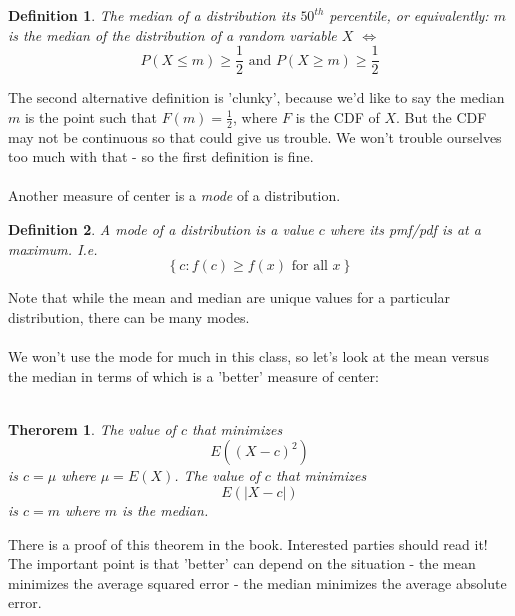 \documentclass[12pt]{article} %
\newtheorem{defn}{Definition}
\newtheorem{thm}{Therorem}
\begin{document}
\begin{defn}
The \emph{median} of a  distribution its $50^{th}$ percentile, or equivalently: $m$ is the median of the distribution of a random variable $X$ $\iff$
$$P(X\leq m)\geq \frac12 \textrm{ and } P(X\geq m)\geq\frac12$$
\end{defn}
The second alternative definition is 'clunky', because we'd like to say the median $m$ is the point such that $F(m) = \frac12$, where $F$ is the CDF of $X$. But the CDF may not be continuous so that could give us trouble. We won't trouble ourselves too much with that - so the first definition is fine.\\\\
Another measure of center is a \emph{mode} of a distribution.\\
\begin{defn}
A \emph{mode} of a distribution is a value $c$ where its pmf/pdf is at a maximum. I.e.
$$\left\{c:f(c)\geq f(x) \textrm{ for all } x\right\}$$ 
\end{defn}
 Note that while the mean and median are unique values for a particular distribution, there can be many modes. \\\\
We won't use the mode for much in this class, so let's look at the mean versus the median in terms of which is a 'better' measure of center:\\\\
\begin{thm}
The value of $c$ that minimizes 
$$E((X-c)^2)$$
is $c=\mu$ where $\mu = E(X)$. The value of $c$ that minimizes
$$E(|X-c|)$$
is $c=m$ where $m$ is the median.
\end{thm}
There is a proof of this theorem in the book. Interested parties should read it! The important point is that 'better' can depend on the situation - the mean minimizes the average squared error - the median minimizes the average absolute error.\\\\
\end{document}
